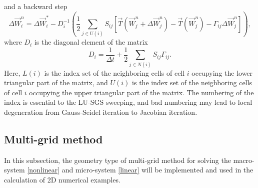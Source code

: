 \documentclass[3p,12pt]{elsarticle}
\begin{document}
	and a backward step
	\begin{equation}
		\Delta \vec{W}_i^{n} = \Delta\vec{W}_{i}^{*} - D_i^{-1} \left( \frac{1}{2}\sum_{j \in U(i)} S_{ij}\left[ \vec{T}\left(\vec{W}_{j}^{n} + \Delta\vec{W}_j^{n} \right) - \vec{T}\left( \vec{W}_j^n\right)  -\Gamma_{ij}\Delta\vec{W}_j^n \right] \right),
	\end{equation}
	where $D_i$ is the diagonal element of the matrix
	\begin{equation}
		D_i = \frac{1}{\Delta t} + \frac{1}{2}\sum_{j \in N(i)}S_{ij}\Gamma_{ij} .
	\end{equation}
	Here, $L(i)$ is the index set of the neighboring cells of cell $i$ occupying the lower triangular part of the matrix, and $U(i)$ is the index set of the neighboring cells of cell $i$ occupying the upper triangular part of the matrix. The numbering of the index is essential to the LU-SGS sweeping, and bad numbering may lead to local degeneration from Gauss-Seidel iteration to Jacobian iteration. %
	\subsection{Multi-grid method}
	In this subsection, the geometry type of multi-grid method \cite{briggs2000multigrid} for solving the macro-system \eqref{nonlinear} and micro-system \eqref{linear} will be implemented and used in the calculation of 2D numerical examples.
	
\end{document}
